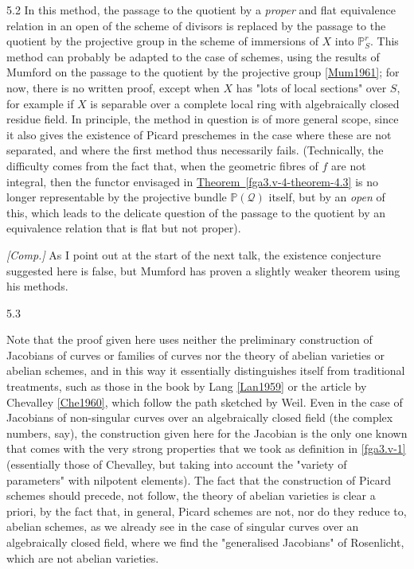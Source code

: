 \begin{remarks}{5.2}
    In this method, the passage to the quotient by a \emph{proper} and flat equivalence relation in an open of the scheme of divisors is replaced by the passage to the quotient by the projective group in the scheme of immersions of \(X\) into \(\mathbb {P}_S^r\).
    This method can probably be adapted to the case of schemes, using the results of Mumford on the passage to the quotient by the projective group \hyperref[Mum1961]{[Mum1961]};
    for now, there is no written proof, except when \(X\) has "lots of local sections" over \(S\), for example if \(X\) is separable over a complete local ring with algebraically closed residue field.
    In principle, the method in question is of more general scope, since it also gives the existence of Picard preschemes in the case where these are not separated, and where the first method thus necessarily fails.
    (Technically, the difficulty comes from the fact that, when the geometric fibres of \(f\) are not integral, then the functor envisaged in \hyperref[fga3.v-4-theorem-4.3]{Theorem~\ref*{fga3.v-4-theorem-4.3}} is no longer representable by the projective bundle \(\mathbb {P}(\mathscr {Q})\) itself, but by an \emph{open} of this, which leads to the delicate question of the passage to the quotient by an equivalence relation that is flat but not proper).\par{}\emph{[Comp.]}
    As I point out at the start of the next talk, the existence conjecture suggested here is false, but Mumford has proven a slightly weaker theorem using his methods.\end{remarks}\begin{remark}{5.3}\label{fga3.v-5-remark-5.3}\skipsinglepar\par{}Note that the proof given here uses neither the preliminary construction of Jacobians of curves or families of curves nor the theory of abelian varieties or abelian schemes, and in this way it essentially distinguishes itself from traditional treatments, such as those in the book by Lang \hyperref[Lan1959]{[Lan1959]} or the article by Chevalley \hyperref[Che1960]{[Che1960]}, which follow the path sketched by Weil.
    Even in the case of Jacobians of non-singular curves over an algebraically closed field (the complex numbers, say), the construction given here for the Jacobian is the only one known that comes with the very strong properties that we took as definition in \cref{fga3.v-1} (essentially those of Chevalley, but taking into account the "variety of parameters" with nilpotent elements).
    The fact that the construction of Picard schemes should precede, not follow, the theory of abelian varieties is clear a priori, by the fact that, in general, Picard schemes are not, nor do they reduce to, abelian schemes, as we already see in the case of singular curves over an algebraically closed field, where we find the "generalised Jacobians" of Rosenlicht, which are not abelian varieties.

\end{remark}
